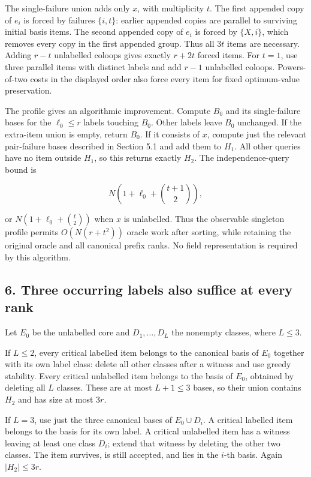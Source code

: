 The single-failure union adds only \(x\), with multiplicity \(t\). The first appended copy of \(e_i\) is forced by failures \(\{i,t\}\): earlier appended copies are parallel to surviving initial basis items. The second appended copy of \(e_i\) is forced by \(\{X,i\}\), which removes every copy in the first appended group. Thus all \(3t\) items are necessary. Adding \(r-t\) unlabelled coloops gives exactly \(r+2t\) forced items. For \(t=1\), use three parallel items with distinct labels and add \(r-1\) unlabelled coloops. Powers-of-two costs in the displayed order also force every item for fixed optimum-value preservation.

The profile gives an algorithmic improvement. Compute \(B_0\) and its single-failure bases for the \(\ell_0\le r\) labels touching \(B_0\). Other labels leave \(B_0\) unchanged. If the extra-item union is empty, return \(B_0\). If it consists of \(x\), compute just the relevant pair-failure bases described in Section 5.1 and add them to \(H_1\). All other queries have no item outside \(H_1\), so this returns exactly \(H_2\). The independence-query bound is

\[
N\left(1+\ell_0+\binom{t+1}{2}\right),
\tag{TF14}
\]

or \(N(1+\ell_0+\binom t2)\) when \(x\) is unlabelled. Thus the observable singleton profile permits \(O(N(r+t^2))\) oracle work after sorting, while retaining the original oracle and all canonical prefix ranks. No field representation is required by this algorithm.

\hypertarget{af-0a3ce40617-three-occurring-labels-also-suffice-at-every-rank}{%
\subsection{6. Three occurring labels also suffice at every rank}\label{af-0a3ce40617-three-occurring-labels-also-suffice-at-every-rank}}

Let \(E_0\) be the unlabelled core and \(D_1,\ldots,D_L\) the nonempty classes, where \(L\le3\).

If \(L\le2\), every critical labelled item belongs to the canonical basis of \(E_0\) together with its own label class: delete all other classes after a witness and use greedy stability. Every critical unlabelled item belongs to the basis of \(E_0\), obtained by deleting all \(L\) classes. These are at most \(L+1\le3\) bases, so their union contains \(H_2\) and has size at most \(3r\).

If \(L=3\), use just the three canonical bases of \(E_0\cup D_i\). A critical labelled item belongs to the basis for its own label. A critical unlabelled item has a witness leaving at least one class \(D_i\); extend that witness by deleting the other two classes. The item survives, is still accepted, and lies in the \(i\)-th basis. Again \(|H_2|\le3r\).


